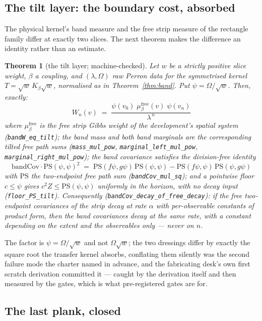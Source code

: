\documentclass[11pt]{article}
\newtheorem{theorem}{Theorem}[section]
\theoremstyle{definition}
\begin{document}
\subsection{The tilt layer: the boundary cost, absorbed}

The physical kernel's band measure and the free strip measure of the
rectangle family differ at exactly two slices.  The next theorem makes the
difference an identity rather than an estimate.

\begin{theorem}[the tilt layer; machine-checked]
\label{thm:tilt}
Let $w$ be a strictly positive slice weight, $\beta$ a coupling, and
$(\lambda,\Omega)$ raw Perron data for the symmetrised kernel
$T=\sqrt{w}\,K_\beta\sqrt{w}$, normalised as in Theorem~\ref{thm:band}.
Put $\psi=\Omega/\sqrt{w}$.  Then, exactly:
\[
  W_n(v)\;=\;\frac{\psi(v_0)\;\mu^{\mathrm{free}}_\beta(v)\;\psi(v_n)}
  {\lambda^{\,n}}
\]
where $\mu^{\mathrm{free}}_\beta$ is the free strip Gibbs weight of the
development's spatial system (\texttt{bandW\_eq\_tilt}); the band mass and
both band marginals are the corresponding tilted free path sums
(\texttt{mass\_mul\_pow}, \texttt{marginal\_left\_mul\_pow},
\texttt{marginal\_right\_mul\_pow}); the band covariance satisfies the
division-free identity
\[
  \mathrm{bandCov}\cdot\mathrm{PS}(\psi,\psi)^2
  \;=\;\mathrm{PS}(f\psi,g\psi)\,\mathrm{PS}(\psi,\psi)
      -\mathrm{PS}(f\psi,\psi)\,\mathrm{PS}(\psi,g\psi)
\]
with $\mathrm{PS}$ the two-endpoint free path sum
(\texttt{bandCov\_mul\_sq}); and a pointwise floor $c\le\psi$ gives
$c^2 Z\le \mathrm{PS}(\psi,\psi)$ uniformly in the horizon, with no decay
input (\texttt{floor\_PS\_tilt}).  Consequently
(\texttt{bandCov\_decay\_of\_free\_decay}): if the \emph{free} two-endpoint
covariances of the strip decay at rate $\alpha$ with per-observable
constants of product form, then the band covariances decay at the
\emph{same} rate, with a constant depending on the extent and the
observables only --- never on $n$.
\end{theorem}

The factor is $\psi=\Omega/\sqrt{w}$ and not $\Omega\sqrt{w}$; the two
dressings differ by exactly the square root the transfer kernel absorbs,
conflating them silently was the second failure mode the charter named in
advance, and the fabricating desk's own first scratch derivation committed
it --- caught by the derivation itself and then measured by the gates,
which is what pre-registered gates are for.

\subsection{The last plank, closed}
\label{sec:transport-open}
\end{document}
